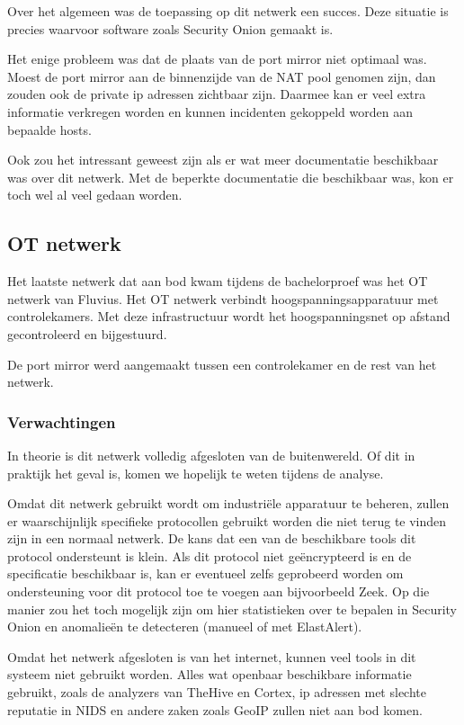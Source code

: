 \documentclass[a4paper, 12pt]{report}
\begin{document}
Over het algemeen was de toepassing op dit netwerk een succes.
Deze situatie is precies waarvoor software zoals Security Onion gemaakt is.

Het enige probleem was dat de plaats van de port mirror niet optimaal was.
Moest de port mirror aan de binnenzijde van de NAT pool genomen zijn, dan zouden ook de private ip adressen zichtbaar zijn.
Daarmee kan er veel extra informatie verkregen worden en kunnen incidenten gekoppeld worden aan bepaalde hosts.

Ook zou het intressant geweest zijn als er wat meer documentatie beschikbaar was over dit netwerk.
Met de beperkte documentatie die beschikbaar was, kon er toch wel al veel gedaan worden.

\subsection{OT netwerk}
\label{sec:ot-netwerk}
Het laatste netwerk dat aan bod kwam tijdens de bachelorproef was het OT netwerk van Fluvius.
Het OT netwerk verbindt hoogspanningsapparatuur met controlekamers.
Met deze infrastructuur wordt het hoogspanningsnet op afstand gecontroleerd en bijgestuurd.

De port mirror werd aangemaakt tussen een controlekamer en de rest van het netwerk.

\subsubsection{Verwachtingen}
In theorie is dit netwerk volledig afgesloten van de buitenwereld.
Of dit in praktijk het geval is, komen we hopelijk te weten tijdens de analyse.

Omdat dit netwerk gebruikt wordt om industriële apparatuur te beheren, zullen er waarschijnlijk specifieke protocollen gebruikt worden die niet terug te vinden zijn in een normaal netwerk.
De kans dat een van de beschikbare tools dit protocol ondersteunt is klein.
Als dit protocol niet geëncrypteerd is en de specificatie beschikbaar is, kan er eventueel zelfs geprobeerd worden om ondersteuning voor dit protocol toe te voegen aan bijvoorbeeld Zeek.
Op die manier zou het toch mogelijk zijn om hier statistieken over te bepalen in Security Onion en anomalieën te detecteren (manueel of met ElastAlert).

Omdat het netwerk afgesloten is van het internet, kunnen veel tools in dit systeem niet gebruikt worden.
Alles wat openbaar beschikbare informatie gebruikt, zoals de analyzers van TheHive en Cortex, ip adressen met slechte reputatie in NIDS en andere zaken zoals GeoIP zullen niet aan bod komen.
\end{document}
